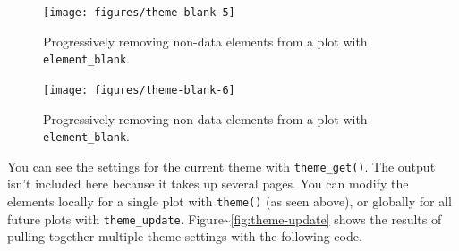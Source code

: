 \begin{Shaded}
\begin{Highlighting}[]
\NormalTok{() +}\StringTok{ }
\StringTok{  }\NormalTok{(} \NormalTok{(), }
         \NormalTok{())}
\end{Highlighting}
\end{Shaded}

\begin{figure}
\texttt{[image: figures/theme-blank-5]} \caption{Progressively removing non-data elements from a plot with \texttt{element\_blank}.\label{fig:theme-blank5}}
\end{figure}

\begin{Shaded}
\begin{Highlighting}[]
\NormalTok{() +}\StringTok{ }\NormalTok{(} \NormalTok{())}
\end{Highlighting}
\end{Shaded}

\begin{figure}
\texttt{[image: figures/theme-blank-6]} \caption{Progressively removing non-data elements from a plot with \texttt{element\_blank}.\label{fig:theme-blank6}}
\end{figure}

You can see the settings for the current theme with
\texttt{theme\_get()}. The output isn't included here because it takes
up several pages. You can modify the elements locally for a single plot
with \texttt{theme()} (as seen above), or globally for all future plots
with \texttt{theme\_update}.
Figure\textasciitilde{}\ref{fig:theme-update} shows the results of
pulling together multiple theme settings with the following code.
  

